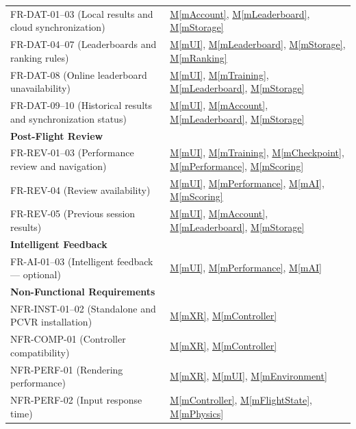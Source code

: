 \documentclass[12pt, titlepage]{article}
\newcommand{\mref}[1]{\hyperref[#1]{M\ref*{#1}}}
\begin{document}
\begin{longtable}{p{} p{}}
FR-DAT-01--03 (Local results and cloud synchronization)
& \mref{mAccount}, \mref{mLeaderboard},
\mref{mStorage} \\

FR-DAT-04--07 (Leaderboards and ranking rules)
& \mref{mUI}, \mref{mLeaderboard},
\mref{mStorage}, \mref{mRanking} \\

FR-DAT-08 (Online leaderboard unavailability)
& \mref{mUI}, \mref{mTraining},
\mref{mLeaderboard}, \mref{mStorage} \\

FR-DAT-09--10 (Historical results and synchronization status)
& \mref{mUI}, \mref{mAccount},
\mref{mLeaderboard}, \mref{mStorage} \\

\midrule
\multicolumn{2}{l}{\textbf{Post-Flight Review}}\\

FR-REV-01--03 (Performance review and navigation)
& \mref{mUI}, \mref{mTraining},
\mref{mCheckpoint}, \mref{mPerformance},
\mref{mScoring} \\

FR-REV-04 (Review availability)
& \mref{mUI}, \mref{mPerformance},
\mref{mAI},
\mref{mScoring} \\

FR-REV-05 (Previous session results)
& \mref{mUI}, \mref{mAccount},
\mref{mLeaderboard}, \mref{mStorage} \\

\midrule
\multicolumn{2}{l}{\textbf{Intelligent Feedback}}\\

FR-AI-01--03 (Intelligent feedback --- optional)
& \mref{mUI}, \mref{mPerformance},
\mref{mAI} \\

\midrule
\multicolumn{2}{l}{\textbf{Non-Functional Requirements}}\\

NFR-INST-01--02 (Standalone and PCVR installation)
& \mref{mXR}, \mref{mController} \\

NFR-COMP-01 (Controller compatibility)
& \mref{mXR}, \mref{mController} \\

NFR-PERF-01 (Rendering performance)
& \mref{mXR}, \mref{mUI},
\mref{mEnvironment} \\

NFR-PERF-02 (Input response time)
& \mref{mController}, \mref{mFlightState},
\mref{mPhysics} \\


\end{longtable}
\end{document}
